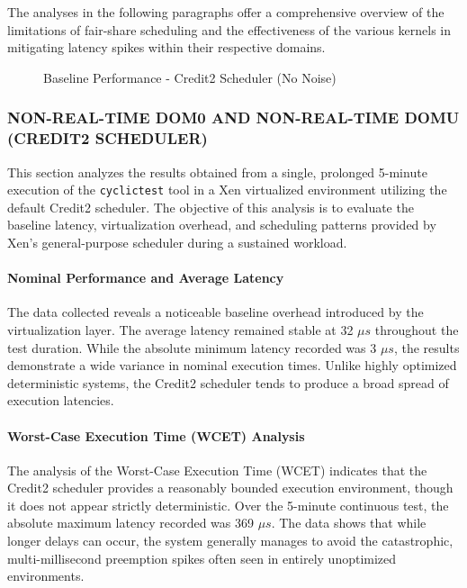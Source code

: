 The analyses in the following paragraphs offer a comprehensive overview
of the limitations of fair-share scheduling and the effectiveness of the
various kernels in mitigating latency spikes within their respective
domains.

\begin{figure}
\centering

\caption{Baseline Performance - Credit2 Scheduler (No Noise)}
\end{figure}

\subsubsection{NON-REAL-TIME DOM0 AND NON-REAL-TIME DOMU (CREDIT2
SCHEDULER)}\label{non-real-time-dom0-and-non-real-time-domu-credit2-scheduler}

This section analyzes the results obtained from a single, prolonged
5-minute execution of the \texttt{cyclictest} tool in a Xen virtualized
environment utilizing the default Credit2 scheduler. The objective of
this analysis is to evaluate the baseline latency, virtualization
overhead, and scheduling patterns provided by Xen's general-purpose
scheduler during a sustained workload.

\paragraph{Nominal Performance and Average
Latency}\label{nominal-performance-and-average-latency-7}

The data collected reveals a noticeable baseline overhead introduced by
the virtualization layer. The average latency remained stable at 32 $\mu s$
throughout the test duration. While the absolute minimum latency
recorded was 3 $\mu s$, the results demonstrate a wide variance in nominal
execution times. Unlike highly optimized deterministic systems, the
Credit2 scheduler tends to produce a broad spread of execution
latencies.

\paragraph{Worst-Case Execution Time (WCET)
Analysis}\label{worst-case-execution-time-wcet-analysis-9}

The analysis of the Worst-Case Execution Time (WCET) indicates that the
Credit2 scheduler provides a reasonably bounded execution environment,
though it does not appear strictly deterministic. Over the 5-minute
continuous test, the absolute maximum latency recorded was 369 $\mu s$. The
data shows that while longer delays can occur, the system generally
manages to avoid the catastrophic, multi-millisecond preemption spikes
often seen in entirely unoptimized environments.

